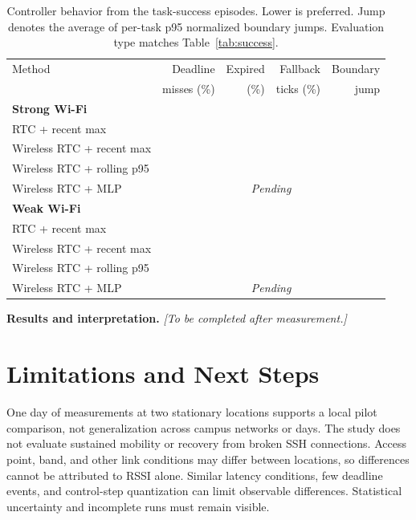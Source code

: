 \documentclass[11pt]{article}
\newcommand{\numplaceholder}{\textemdash}
\newcommand{\resultplaceholder}{\textit{[To be completed after measurement.]}}
\newcommand{\pending}{\textit{Pending}}
\begin{document}
\begin{table}[htbp]
\centering
\caption{Controller behavior from the task-success episodes. Lower is preferred. Jump denotes the average of per-task p95 normalized boundary jumps. Evaluation type matches Table~\ref{tab:success}.}
\label{tab:controller}
\small
\begin{tabularx}{\linewidth}{Xrrrr}
\toprule
Method & Deadline & Expired & Fallback & Boundary\\
 & misses (\%) & (\%) & ticks (\%) & jump\\
\midrule
\multicolumn{5}{l}{\textbf{Strong Wi-Fi}}\\
RTC + recent max & \numplaceholder & \numplaceholder & \numplaceholder & \numplaceholder\\
Wireless RTC + recent max & \numplaceholder & \numplaceholder & \numplaceholder & \numplaceholder\\
Wireless RTC + rolling p95 & \numplaceholder & \numplaceholder & \numplaceholder & \numplaceholder\\
Wireless RTC + MLP & \multicolumn{4}{c}{\pending}\\
\midrule
\multicolumn{5}{l}{\textbf{Weak Wi-Fi}}\\
RTC + recent max & \numplaceholder & \numplaceholder & \numplaceholder & \numplaceholder\\
Wireless RTC + recent max & \numplaceholder & \numplaceholder & \numplaceholder & \numplaceholder\\
Wireless RTC + rolling p95 & \numplaceholder & \numplaceholder & \numplaceholder & \numplaceholder\\
Wireless RTC + MLP & \multicolumn{4}{c}{\pending}\\
\bottomrule
\end{tabularx}
\end{table}
\textbf{Results and interpretation.} \resultplaceholder
\FloatBarrier

\section{Limitations and Next Steps}
One day of measurements at two stationary locations supports a local pilot comparison, not generalization across campus networks or days. The study does not evaluate sustained mobility or recovery from broken SSH connections. Access point, band, and other link conditions may differ between locations, so differences cannot be attributed to RSSI alone. Similar latency conditions, few deadline events, and control-step quantization can limit observable differences. Statistical uncertainty and incomplete runs must remain visible.
\end{document}
